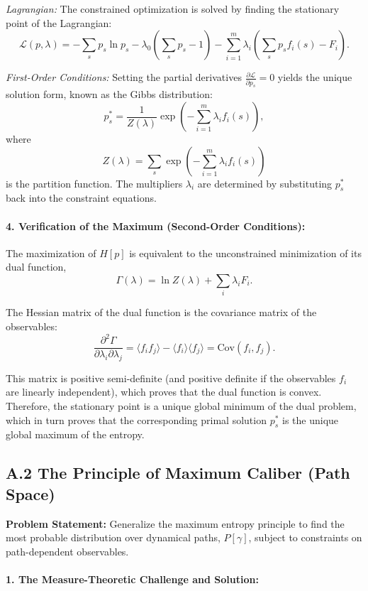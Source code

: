 \documentclass[12pt, a4paper]{article}
\begin{document}
\emph{Lagrangian:} The constrained optimization is solved by finding the stationary point of the Lagrangian:
\[
\mathcal{L}(p, \lambda) = - \sum_s p_s \ln p_s - \lambda_0 \left( \sum_s p_s - 1 \right) - \sum_{i=1}^m \lambda_i \left( \sum_s p_s f_i(s) - F_i \right).
\]

\emph{First-Order Conditions:} Setting the partial derivatives \(\frac{\partial \mathcal{L}}{\partial p_s} = 0\) yields the unique solution form, known as the Gibbs distribution:
\[
p_s^* = \frac{1}{Z(\lambda)} \exp\left( - \sum_{i=1}^m \lambda_i f_i(s) \right),
\]
where
\[
Z(\lambda) = \sum_s \exp\left( - \sum_{i=1}^m \lambda_i f_i(s) \right)
\]
is the partition function. The multipliers \(\lambda_i\) are determined by substituting \(p_s^*\) back into the constraint equations.

\paragraph{4. Verification of the Maximum (Second-Order Conditions):}

The maximization of \(H[p]\) is equivalent to the unconstrained minimization of its dual function,
\[
\Gamma(\lambda) = \ln Z(\lambda) + \sum_i \lambda_i F_i.
\]

The Hessian matrix of the dual function is the covariance matrix of the observables:
\[
\frac{\partial^2 \Gamma}{\partial \lambda_i \partial \lambda_j} = \langle f_i f_j \rangle - \langle f_i \rangle \langle f_j \rangle = \mathrm{Cov}(f_i, f_j).
\]

This matrix is positive semi-definite (and positive definite if the observables \( f_i \) are linearly independent), which proves that the dual function is convex. Therefore, the stationary point is a unique global minimum of the dual problem, which in turn proves that the corresponding primal solution \( p_s^* \) is the unique global maximum of the entropy.

\subsection*{A.2 The Principle of Maximum Caliber (Path Space)}

\textbf{Problem Statement:} Generalize the maximum entropy principle to find the most probable distribution over dynamical paths, \( P[\gamma] \), subject to constraints on path-dependent observables.

\paragraph{1. The Measure-Theoretic Challenge and Solution:}
\end{document}
